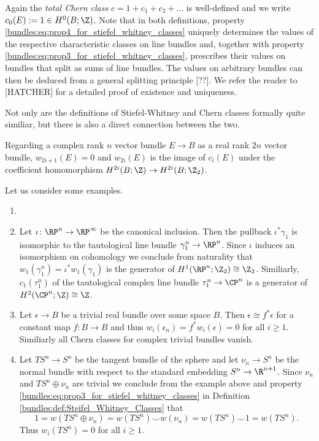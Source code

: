 Again the \textit{total Chern class} $c = 1 + c_1 + c_2 + \ldots$ is well-defined and we write $c_0(E) := 1 \in H^0(B;\Z)$. Note that in both definitions, property \ref{bundles:eq:prop4_for_stiefel_whitney_classes} uniquely determines the values of the respective characteristic classes on line bundles and, together with property \ref{bundles:eq:prop3_for_stiefel_whitney_classes}, prescribes their values on bundles that split as sums of line bundles. The values on arbitrary bundles can then be deduced from a general splitting principle [??]. We refer the reader to [HATCHER] for a detailed proof of existence and uniqueness.

Not only are the definitions of Stiefel-Whitney and Chern classes formally quite similiar, but there is also a direct connection between the two.

\begin{proposition}
    \label{bundles:prop:connection_chern_stiefel_whitney_classes}
    Regarding a complex rank $n$ vector bundle $E \to B$ as a real rank $2n$ vector bundle, $w_{2i +1}(E) = 0$ and $w_{2i}(E)$ is the image of $c_i(E)$ under the coefficient homomorphism $H^{2i}(B;\Z) \to H^{2i}(B;\Z_2)$.  
\end{proposition}

Let us consider some examples.

\begin{example}
    \label{bundles:ex:characteristic_classes}
    \begin{enumerate}[label=(\roman*)]
        \item[]
        \item Let $\iota \colon \RP^n \to \RP^\infty$ be the canonical inclusion. Then the pullback $\iota^\ast \gamma_1$ is isomorphic to the tautological line bundle $\gamma_1^n \to \RP^n$. Since $\iota$ induces an isomorphism on cohomology we conclude from naturality that $w_1(\gamma_1^n) = \iota^\ast w_1(\gamma_1)$ is the generator of $H^1(\RP^n;\Z_2) \cong \Z_2$. Similiarly, $c_1(\tau_1^n)$ of the tautological complex line bundle $\tau_1^n \to \CP^n$ is a generator of $H^2(\CP^n;\Z) \cong \Z$.
        \item Let $\epsilon \to B$ be a trivial real bundle over some space $B$. Then $\epsilon \cong f^\ast \epsilon$ for a constant map $f \colon B \to B$ and thus $w_i(\epsilon_n) = f^\ast w_i(\epsilon) = 0$ for all $i \geq 1$. Similiarly all Chern classes for complex trivial bundles vanish.
        \item \label{bundles:ex:characteristic_classes_part3} Let $TS^n \to S^n$ be the tangent bundle of the sphere and let $\nu_n \to S^n$ be the normal bundle with respect to the standard embedding $S^n \to \R^{n+1}$. Since $\nu_n$ and $TS^n \oplus \nu_n$ are trivial we conclude from the example above and property \ref{bundles:eq:prop3_for_stiefel_whitney_classes} in Definition \ref{bundles:def:Steifel_Whitney_Classes} that 
        \[
        1 = w(TS^n \oplus \nu_n) = w(TS^n) \smile w(\nu_n) = w(TS^n) \smile 1 = w(TS^n).
        \]
        Thus $w_i(TS^n) = 0$ for all $i \geq 1$.
    \end{enumerate}
\end{example}

